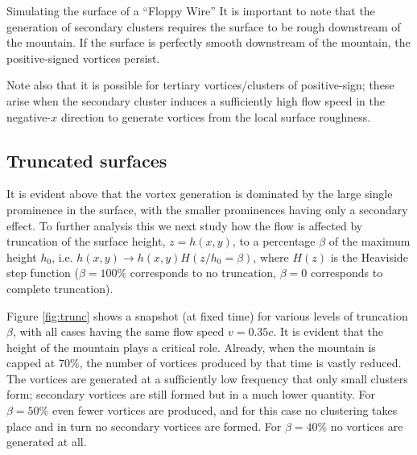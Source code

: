 \begin{chapter}{\label{cha:afm}Simulating the surface of a ``Floppy Wire''}
It is important to note that the generation of secondary clusters requires the surface to be rough downstream of the mountain.  If the surface is perfectly smooth downstream of the mountain, the positive-signed vortices persist.  

Note also that it is possible for tertiary vortices/clusters of positive-sign; these arise when the secondary cluster induces a sufficiently high flow speed in the negative-$x$ direction to generate vortices from the local surface roughness.

\subsection{Truncated surfaces}
It is evident above that the vortex generation is dominated by the large single prominence in the surface, with the smaller prominences having only a secondary effect.  To further analysis this we next study how the flow is affected by truncation of the surface height, $z=h(x,y)$, to a percentage $\beta$ of the maximum height $h_0$, i.e. $h(x,y) \rightarrow h(x,y) H(z/h_0=\beta)$, where $H(z)$ is the Heaviside step function ($\beta=100\%$ corresponds to no truncation, $\beta=0$ corresponds to complete truncation).

Figure \ref{fig:trunc} shows a snapshot (at fixed time) for various levels of truncation $\beta$, with all cases having the same flow speed $v=0.35c$.  It is evident that the height of the mountain plays a critical role.  Already, when the mountain is capped at $70\%$, the number of vortices produced by that time is vastly reduced.  The vortices are generated at a sufficiently low frequency that only small clusters form; secondary vortices are still formed but in a much lower quantity.  For $\beta=50\%$ even fewer vortices are produced, and for this case no clustering takes place and in turn no secondary vortices are formed.  For $\beta=40\%$ no vortices are generated at all.  


\end{chapter}
